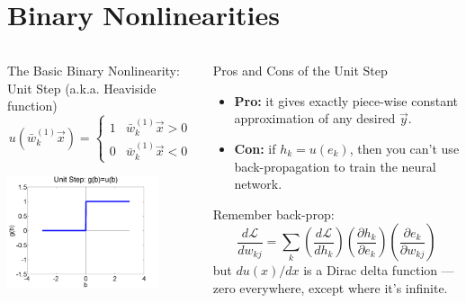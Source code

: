 \documentclass{beamer}
\begin{document}
\section{Binary Nonlinearities}
\setcounter{subsection}{1}

\begin{frame}
  \begin{columns}[t]
    \column{1.85in}
    \begin{block}{The Basic Binary  Nonlinearity: Unit Step (a.k.a. Heaviside function)}
      \[
      u\left(\bar{w}_k^{(1)}\vec{x}\right)=\begin{cases}
      1 & \bar{w}_k^{(1)}\vec{x} > 0\\
      0 & \bar{w}_k^{(1)}\vec{x} < 0
      \end{cases}
      \]
      \centerline{\includegraphics[width=1.75in]{figs/nn_unitstep.png}}
    \end{block}
    \column{2.65in}
    \begin{block}{Pros and Cons of the Unit Step}
      \begin{itemize}
      \item {\bf Pro:} it gives exactly piece-wise constant
        approximation of any desired $\vec{y}$.
      \item {\bf Con:} if $h_k=u(e_k)$, then you can't use
        back-propagation to train the neural network.
      \end{itemize}
      Remember back-prop:
      \[
      \frac{d{\mathcal L}}{dw_{kj}}=
      \sum_k\left(\frac{d{\mathcal L}}{dh_k}\right)
      \left(\frac{\partial h_k}{\partial e_k}\right)
      \left(\frac{\partial e_k}{\partial w_{kj}}\right)
      \]
      but $du(x)/dx$ is a Dirac delta function ---
      zero everywhere, except where it's infinite.
    \end{block}
  \end{columns}
\end{frame}
  
\end{document}
